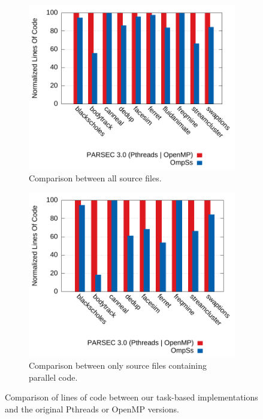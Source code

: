 \begin{figure}[!htbp]
        \centering
        \begin{subfigure}[b]{0.8\textwidth}
                \includegraphics[width=\textwidth]{task_benchmarks/figures/absolute_loc_norm}%
                \caption{Comparison between all source files.}%
                \label{fig:absolute_loc}
                \vspace{0.4cm}
        \end{subfigure}%
				\hfill
        \begin{subfigure}[b]{0.8\textwidth}
        \includegraphics[width=\textwidth]{task_benchmarks/figures/relative_loc_norm}%
        \caption{Comparison between only source files containing parallel code.}%
        \label{fig:relative_loc}%
        \end{subfigure}%
  \caption{Comparison of lines of code between our task-based implementations and the original Pthreads or OpenMP versions.}
        \label{fig:loc_comparison}
\end{figure}


